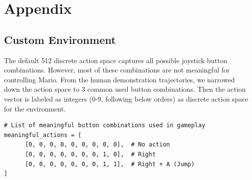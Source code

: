 \documentclass{article}
\begin{document}
\clearpage
\appendix
\renewcommand{\thefigure}{A\arabic{figure}}
\renewcommand{\thetable}{A\arabic{table}}
\setcounter{figure}{0}
\setcounter{table}{0}
\onecolumn
\section{Appendix}
\subsection{Custom Environment}
\label{a1:custom_env}

The default 512 discrete action space captures all possible joystick button 
combinations. However, most of these combinations are not meaningful for 
controlling Mario. From the human demonstration trajectories, we narrowed down 
the action space to 3 common used button combinations.
Then the action vector is labeled as integers (0-9, following below orders)
as discrete action space for the environment.

\begin{verbatim}
# List of meaningful button combinations used in gameplay
meaningful_actions = [
      [0, 0, 0, 0, 0, 0, 0, 0, 0],  # No action
      [0, 0, 0, 0, 0, 0, 0, 1, 0],  # Right
      [0, 0, 0, 0, 0, 0, 0, 1, 1],  # Right + A (Jump)
]
\end{verbatim}
\end{document}
